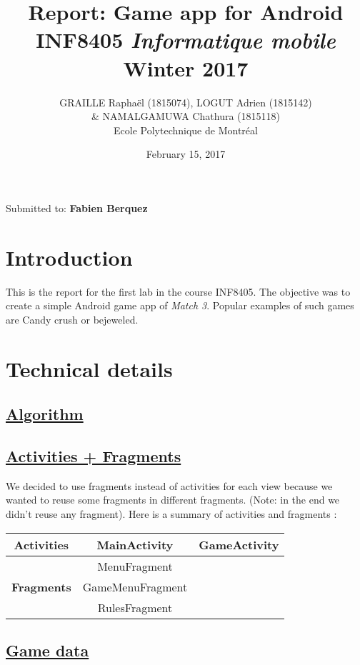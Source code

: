 \documentclass{article}
\title{Report: Game app for Android\\ INF8405 \textit{Informatique mobile}\\ Winter 2017 }
\author{GRAILLE Raphaël  (1815074), LOGUT Adrien (1815142) \\ \& NAMALGAMUWA Chathura (1815118)\\ Ecole Polytechnique de Montréal}
\date{February 15, 2017}
\begin{document}
\maketitle

Submitted to: \textbf{Fabien Berquez}
\newpage

\tableofcontents

\newpage

\section{Introduction}

This is the report for the first lab in the course INF8405. The objective was to create a simple Android game app of \textit{Match 3}. Popular examples of such games are Candy crush or bejeweled. 

\section{Technical details}


\subsection{\href{https://www.youtube.com/watch?v=8y6zNR4X8xs&feature=youtu.be&t=4m29s}{Algorithm}}


\subsection{\href{http://data.whicdn.com/images/28718572/large.gif}{Activities + Fragments}}

We decided to use fragments instead of activities for each view because we wanted to reuse some fragments in different fragments. (Note: in the end we didn't reuse any fragment). Here is a summary of activities and fragments :

\begin{tabular}{|c|c|c|}
\hline
\textbf{Activities} & MainActivity & GameActivity \\
\hline
\multirow{3}{*}{\textbf{Fragments}} & MenuFragment & \multirow{3}{*}{} \\
&GameMenuFragment&\\
&RulesFragment&\\
\hline
\end{tabular}

\subsection{\href{http://31.media.tumblr.com/45b4d84ab9018d9f65a7a25c60775ec7/tumblr_nc122coAXY1rpco88o1_400.gif}{Game data}}
\end{document}
